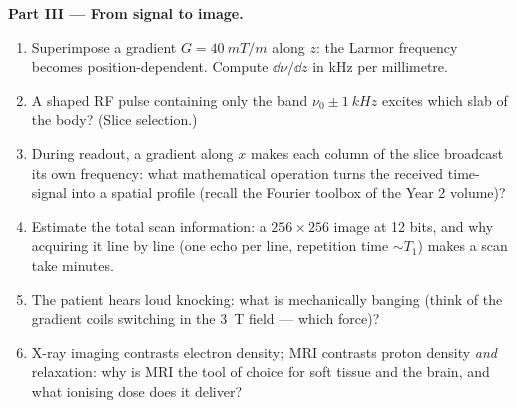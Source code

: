 \begin{problem}
\medskip\noindent\textbf{Part III --- From signal to image.}
\begin{enumerate}[resume]
  \item Superimpose a gradient $G = \qty{40}{mT/m}$ along $z$: the
        Larmor frequency becomes position-dependent. Compute
        $\dd\nu/\dd z$ in kHz per millimetre.
  \item A shaped RF pulse containing only the band $\nu_0 \pm
        \qty{1}{kHz}$ excites which slab of the body? (Slice
        selection.)
  \item During readout, a gradient along $x$ makes each column of
        the slice broadcast its own frequency: what mathematical
        operation turns the received time-signal into a spatial
        profile (recall the Fourier toolbox of the Year 2 volume)?
  \item Estimate the total scan information: a $256 \times 256$
        image at 12 bits, and why acquiring it line by line
        (one echo per line, repetition time $\sim T_1$) makes a
        scan take minutes.
  \item The patient hears loud knocking: what is mechanically
        banging (think of the gradient coils switching in the
        \qty{3}{T} field --- which force)?
  \item X-ray imaging contrasts electron density; MRI contrasts
        proton density \emph{and} relaxation: why is MRI the tool
        of choice for soft tissue and the brain, and what ionising
        dose does it deliver?
\end{enumerate}


\end{problem}
